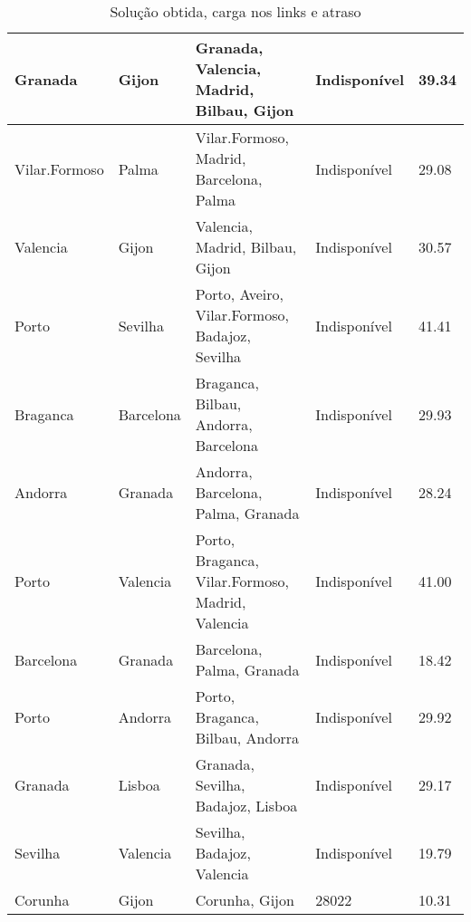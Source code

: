 \begin{table}[!htb]
{\begin{tabular}{|l|l|l|l|l|}
Granada & Gijon & Granada, Valencia, Madrid, Bilbau, Gijon & Indisponível & 39.34 \\ \hline
Vilar.Formoso & Palma & Vilar.Formoso, Madrid, Barcelona, Palma & Indisponível & 29.08 \\ \hline
Valencia & Gijon & Valencia, Madrid, Bilbau, Gijon & Indisponível & 30.57 \\ \hline
Porto & Sevilha & Porto, Aveiro, Vilar.Formoso, Badajoz, Sevilha & Indisponível & 41.41 \\ \hline
Braganca & Barcelona & Braganca, Bilbau, Andorra, Barcelona & Indisponível & 29.93 \\ \hline
Andorra & Granada & Andorra, Barcelona, Palma, Granada & Indisponível & 28.24 \\ \hline
Porto & Valencia & Porto, Braganca, Vilar.Formoso, Madrid, Valencia & Indisponível & 41.00 \\ \hline
Barcelona & Granada & Barcelona, Palma, Granada & Indisponível & 18.42 \\ \hline
Porto & Andorra & Porto, Braganca, Bilbau, Andorra & Indisponível & 29.92 \\ \hline
Granada & Lisboa & Granada, Sevilha, Badajoz, Lisboa & Indisponível & 29.17 \\ \hline
Sevilha & Valencia & Sevilha, Badajoz, Valencia & Indisponível & 19.79 \\ \hline
Corunha & Gijon & Corunha, Gijon & 28022 & 10.31 \\ \hline
\end{tabular}}
\caption[]{Solução obtida, carga nos links e atraso}
\end{table}

\begin{table}[!htb]
        \centering
\caption[]{Solução obtida, carga nos links e atraso}
\end{table}

